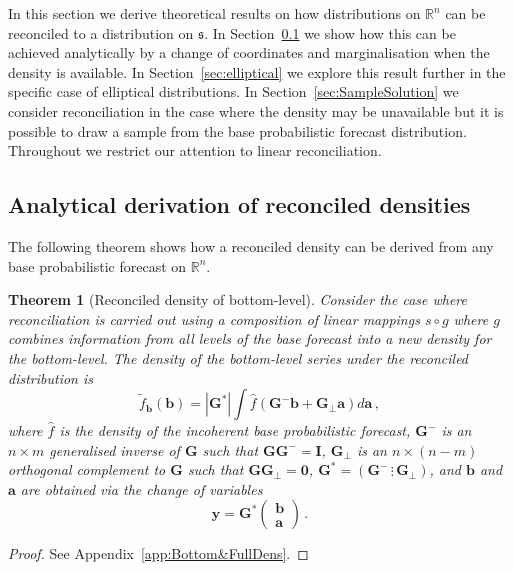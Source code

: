 \documentclass[11pt]{article}
\newtheorem{theo}{Theorem}[section]
\theoremstyle{definition}
\begin{document}
In this section we derive theoretical results on how distributions on $\mathbb{R}^n$ can be reconciled to a distribution on $\mathfrak{s}$. In Section~\ref{sec:andens} we show how this can be achieved analytically by a change of coordinates and marginalisation when the density is available. In Section~\ref{sec:elliptical} we explore this result further in the specific case of elliptical distributions. In Section~\ref{sec:SampleSolution} we consider reconciliation in the case where the density may be unavailable but it is possible to draw a sample from the base probabilistic forecast distribution. Throughout we restrict our attention to linear reconciliation.

\subsection{Analytical derivation of reconciled densities}\label{sec:andens}

The following theorem shows how a reconciled density can be derived from any base probabilistic forecast on $\mathbb{R}^n$.

\begin{theo}[Reconciled density of bottom-level]\label{theo:bottomdens}
	Consider the case where reconciliation is carried out using a composition of linear mappings $s\circ g$ where $g$ combines information from all levels of the base forecast into a new density for the bottom-level. The density of the bottom-level series under the reconciled distribution is
	\[
	\tilde{f}_{\bm{b}}(\bm{b})=|\bm{G}^*|\int \hat{f}(\bm{G}^{-}\bm{b}+\bm{G}_\perp \bm{a})d\bm{a}\,,
	\]
	where $\hat{f}$ is the density of the incoherent base probabilistic forecast, $\bm{G^-}$ is an $n\times m$ generalised inverse of $\bm{G}$ such that $\bm{G}\bm{G}^-=\bm{I}$, $\bm{G_\perp}$ is an $n\times (n-m)$ orthogonal complement to $\bm{G}$ such that $\bm{G}\bm{G}_\perp=\bm{0}$, $\bm{G}^*=\left(\bm{G}^-\,\vdots\,\bm{G}_\perp\right)$, and $\bm{b}$ and $\bm{a}$ are obtained via the change of variables
	\[
	\bm{y}=\bm{G}^*\begin{pmatrix}\bm{b}\\\bm{a}\end{pmatrix}\,.
	\]
\end{theo}

\begin{proof}
	See Appendix~\ref{app:Bottom&FullDens}.
\end{proof}
\end{document}
